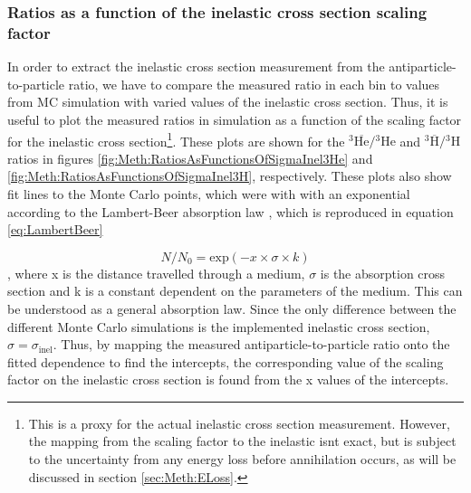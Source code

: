 \subsubsection{Ratios as a function of the inelastic cross section scaling factor}
In order to extract the inelastic cross section measurement from the antiparticle-to-particle ratio, we have to compare the measured ratio in each bin to values from MC simulation with varied values of the inelastic cross section. Thus, it is useful to plot the measured ratios in simulation as a function of the scaling factor for the inelastic cross section\footnote{This is a proxy for the actual inelastic cross section measurement. However, the mapping from the scaling factor to the inelastic isnt exact, but is subject to the uncertainty from any energy loss before annihilation occurs, as will be discussed in section \ref{sec:Meth:ELoss}.}. These plots are shown for the $^3\overline{\mathrm{He}}/{^3\mathrm{He}}$ and $^3\overline{\mathrm{H}}/{^3\mathrm{H}}$ ratios in figures \ref{fig:Meth:RatiosAsFunctionsOfSigmaInel3He} and \ref{fig:Meth:RatiosAsFunctionsOfSigmaInel3H}, respectively. These plots also show fit lines to the Monte Carlo points, which were with with an exponential according to the Lambert-Beer absorption law \cite{}, which is reproduced in equation \ref{eq:LambertBeer}

\begin{equation}\label{eq:LambertBeer}
    N/N_0 = \mathrm{exp}\left( -x\times \sigma \times k \right)
\end{equation}
, where x is the distance travelled through a medium, $\sigma$ is the absorption cross section and k is a constant dependent on the parameters of the medium. This can be understood as a general absorption law. Since the only difference between the different Monte Carlo simulations is the implemented inelastic cross section, $\sigma = \sigma_\mathrm{inel}$. Thus, by mapping the measured antiparticle-to-particle ratio onto the fitted dependence to find the intercepts, the corresponding value of the scaling factor on the inelastic cross section is found from the x values of the intercepts. \\

